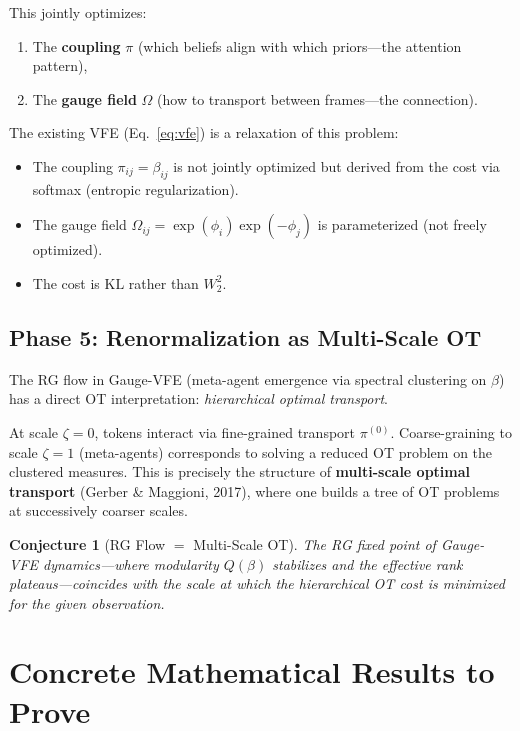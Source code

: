 \documentclass[11pt]{article}
\newtheorem{conjecture}{Conjecture}
\newcommand{\KL}{\mathrm{KL}}
\begin{document}
This jointly optimizes:
\begin{enumerate}
    \item The \textbf{coupling} $\pi$ (which beliefs align with which priors---the attention pattern),
    \item The \textbf{gauge field} $\Omega$ (how to transport between frames---the connection).
\end{enumerate}

The existing VFE (Eq.~\ref{eq:vfe}) is a relaxation of this problem:
\begin{itemize}
    \item The coupling $\pi_{ij} = \beta_{ij}$ is not jointly optimized but derived from the cost via softmax (entropic regularization).
    \item The gauge field $\Omega_{ij} = \exp(\phi_i)\exp(-\phi_j)$ is parameterized (not freely optimized).
    \item The cost is $\KL$ rather than $W_2^2$.
\end{itemize}

\subsection{Phase 5: Renormalization as Multi-Scale OT}

The RG flow in Gauge-VFE (meta-agent emergence via spectral clustering on $\beta$) has a direct OT interpretation: \emph{hierarchical optimal transport}.

At scale $\zeta = 0$, tokens interact via fine-grained transport $\pi^{(0)}$. Coarse-graining to scale $\zeta = 1$ (meta-agents) corresponds to solving a reduced OT problem on the clustered measures. This is precisely the structure of \textbf{multi-scale optimal transport} (Gerber \& Maggioni, 2017), where one builds a tree of OT problems at successively coarser scales.

\begin{conjecture}[RG Flow $=$ Multi-Scale OT]
The RG fixed point of Gauge-VFE dynamics---where modularity $Q(\beta)$ stabilizes and the effective rank plateaus---coincides with the scale at which the hierarchical OT cost is minimized for the given observation.
\end{conjecture}


\section{Concrete Mathematical Results to Prove}
\end{document}
